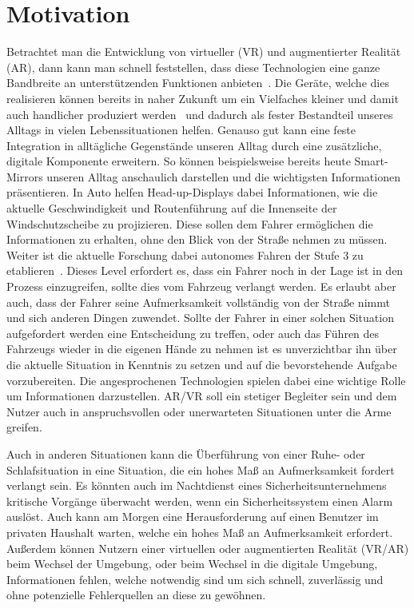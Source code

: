 \section{Motivation}\label{sec:motivation}

Betrachtet man die Entwicklung von virtueller (VR) und augmentierter Realität (AR), dann kann man schnell feststellen, dass diese Technologien eine ganze Bandbreite an unterstützenden Funktionen anbieten~\cite{hughes2005mixed,medenica2011augmented,hayhurst2018augmented}. Die Geräte, welche dies realisieren können bereits in naher Zukunft um ein Vielfaches kleiner und damit auch handlicher produziert werden~\cite{shibata2002head} und dadurch als fester Bestandteil unseres Alltags in vielen Lebenssituationen helfen.
Genauso gut kann eine feste Integration in alltägliche Gegenstände unseren Alltag durch eine zusätzliche, digitale Komponente erweitern. So können beispielsweise bereits heute Smart-Mirrors unseren Alltag anschaulich darstellen und die wichtigsten Informationen präsentieren. 
In Auto helfen Head-up-Displays dabei Informationen, wie die aktuelle Geschwindigkeit und Routenführung auf die Innenseite der Windschutzscheibe zu projizieren. Diese sollen dem Fahrer ermöglichen die Informationen zu erhalten, ohne den Blick von der Straße nehmen zu müssen.
Weiter ist die aktuelle Forschung dabei autonomes Fahren der Stufe 3 zu etablieren~\cite{rodel2014towards}. Dieses Level erfordert es, dass ein Fahrer noch in der Lage ist in den Prozess einzugreifen, sollte dies vom Fahrzeug verlangt werden. Es erlaubt aber auch, dass der Fahrer seine Aufmerksamkeit vollständig von der Straße nimmt und sich anderen Dingen zuwendet.
Sollte der Fahrer in einer solchen Situation aufgefordert werden eine Entscheidung zu treffen, oder auch das Führen des Fahrzeugs wieder in die eigenen Hände zu nehmen ist es unverzichtbar ihn über die aktuelle Situation in Kenntnis zu setzen und auf die bevorstehende Aufgabe vorzubereiten. 
Die angesprochenen Technologien spielen dabei eine wichtige Rolle um Informationen darzustellen. AR/VR soll ein stetiger Begleiter sein und dem Nutzer auch in anspruchsvollen oder unerwarteten Situationen unter die Arme greifen.

Auch in anderen Situationen kann die Überführung von einer Ruhe- oder Schlafsituation in eine Situation, die ein hohes Maß an Aufmerksamkeit fordert verlangt sein. Es könnten auch im Nachtdienst eines Sicherheitsunternehmens kritische Vorgänge überwacht werden, wenn ein Sicherheitssystem einen Alarm auslöst. Auch kann am Morgen eine Herausforderung auf einen Benutzer im privaten Haushalt warten, welche ein hohes Maß an Aufmerksamkeit erfordert. 
Außerdem können Nutzern einer virtuellen oder augmentierten Realität (VR/AR) beim Wechsel der Umgebung, oder beim Wechsel in die digitale Umgebung, Informationen fehlen, welche notwendig sind um sich schnell, zuverlässig und ohne potenzielle Fehlerquellen an diese zu gewöhnen.

